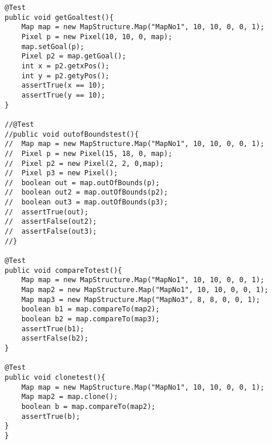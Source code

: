 \documentclass[12pt, a4paper]{report}
\begin{document}
\begin{lstlisting}
@Test
public void getGoaltest(){
	Map map	= new MapStructure.Map("MapNo1", 10, 10, 0, 0, 1);
	Pixel p = new Pixel(10, 10, 0, map);
	map.setGoal(p);
	Pixel p2 = map.getGoal();
	int x = p2.getxPos();
	int y = p2.getyPos();
	assertTrue(x == 10);
	assertTrue(y == 10);
}

//@Test
//public void outofBoundstest(){
//	Map map	= new MapStructure.Map("MapNo1", 10, 10, 0, 0, 1);
//	Pixel p = new Pixel(15, 18, 0, map);
//	Pixel p2 = new Pixel(2, 2, 0,map);
//	Pixel p3 = new Pixel();
//	boolean out = map.outOfBounds(p);
//	boolean out2 = map.outOfBounds(p2);
//	boolean out3 = map.outOfBounds(p3);
//	assertTrue(out);
//	assertFalse(out2);
//	assertFalse(out3);
//}

@Test
public void compareTotest(){
	Map map	= new MapStructure.Map("MapNo1", 10, 10, 0, 0, 1);
	Map map2 = new MapStructure.Map("MapNo1", 10, 10, 0, 0, 1);
	Map map3 = new MapStructure.Map("MapNo3", 8, 8, 0, 0, 1);
	boolean b1 = map.compareTo(map2);
	boolean b2 = map.compareTo(map3);
	assertTrue(b1);
	assertFalse(b2);
}

@Test
public void clonetest(){
	Map map	= new MapStructure.Map("MapNo1", 10, 10, 0, 0, 1);
	Map map2 = map.clone();
	boolean b = map.compareTo(map2);
	assertTrue(b);
}
}

	

\end{lstlisting} 
\end{document}
